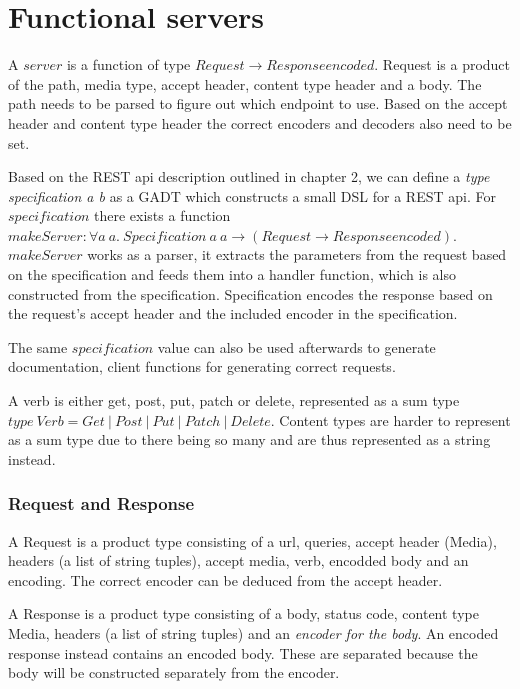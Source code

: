 \section{Functional servers}

A $server$ is a function of type $Request \rightarrow Response encoded$.
Request is a product of the path, media type, accept header, content type header
and a body. The path needs to be parsed to figure out which endpoint to use.
Based on the accept header and content type header the correct encoders and
decoders also need to be set.

Based on the REST api description outlined in chapter 2, we can define a
\textit{type specification a b} as a GADT which constructs a small DSL for a
REST api. For $specification$ there exists a function $makeServer : \forall a\
a.\ Specification\ a\ a \rightarrow (Request \rightarrow Response encoded)$.
$makeServer$ works as a parser, it extracts the parameters from the request
based on the specification and feeds them into a handler function, which is also
constructed from the specification. Specification encodes the response based on
the request's accept header and the included encoder in the specification.

The same $specification$ value can also be used afterwards to generate
documentation, client functions for generating correct requests.

\theoremstyle{definition}

A verb is either get, post, put, patch or delete, represented as a sum type
$type\ Verb = Get\ |\ Post\ |\ Put\ |\ Patch\ |\
Delete$. Content types are harder to represent as a sum type due to there being
so many and are thus represented as a string instead.

\subsubsection{Request and Response}

A Request is a product type consisting of a url, queries, accept header (Media),
headers (a list of string tuples), accept media, verb, encodded body and an
encoding. The correct encoder can be deduced from the accept header.

A Response is a product type consisting of a body, status code, content type
Media, headers (a list of string tuples) and an \textit{encoder for the body}.
An encoded response instead contains an encoded body. These are separated
because the body will be constructed separately from the encoder.

